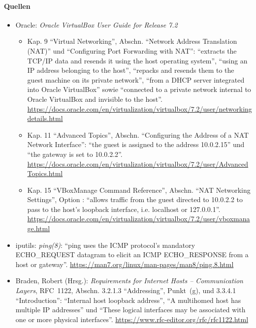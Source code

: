 \paragraph{Quellen}
\begin{itemize}[quellen]
  \item Oracle: \emph{Oracle VirtualBox User Guide for Release 7.2}
  \begin{itemize}[nosep]
    \item Kap. 9 \enquote{Virtual Networking}, Abschn. \enquote{Network Address Translation (NAT)} und \enquote{Configuring Port Forwarding with NAT}: \enquote{extracts the TCP/IP data and resends it using the host operating system}, \enquote{using an IP address belonging to the host}, \enquote{repacks and resends them to the guest machine on its private network}, \enquote{from a DHCP server integrated into Oracle VirtualBox} sowie \enquote{connected to a private network internal to Oracle VirtualBox and invisible to the host}. \url{https://docs.oracle.com/en/virtualization/virtualbox/7.2/user/networkingdetails.html}
    \item Kap. 11 \enquote{Advanced Topics}, Abschn. \enquote{Configuring the Address of a NAT Network Interface}: \enquote{the guest is assigned to the address 10.0.2.15} und \enquote{the gateway is set to 10.0.2.2}. \url{https://docs.oracle.com/en/virtualization/virtualbox/7.2/user/AdvancedTopics.html}
    \item Kap. 15 \enquote{VBoxManage Command Reference}, Abschn. \enquote{NAT Networking Settings}, Option : \enquote{allows traffic from the guest directed to 10.0.2.2 to pass to the host's loopback interface, i.e. localhost or 127.0.0.1}. \url{https://docs.oracle.com/en/virtualization/virtualbox/7.2/user/vboxmanage.html}
  \end{itemize}
  \item iputils: \emph{ping(8)}: \enquote{ping uses the ICMP protocol's mandatory ECHO\_REQUEST datagram to elicit an ICMP ECHO\_RESPONSE from a host or gateway}. \url{https://man7.org/linux/man-pages/man8/ping.8.html}
  \item Braden, Robert (Hrsg.): \emph{Requirements for Internet Hosts -- Communication Layers}, RFC~1122, Abschn. 3.2.1.3 \enquote{Addressing}, Punkt~(g), und 3.3.4.1 \enquote{Introduction}: \enquote{Internal host loopback address}, \enquote{A multihomed host has multiple IP addresses} und \enquote{These logical interfaces may be associated with one or more physical interfaces}. \url{https://www.rfc-editor.org/rfc/rfc1122.html}

\end{itemize}
